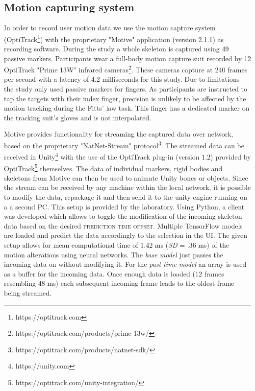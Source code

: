 \documentclass[sigconf]{acmart}
\begin{document}
\subsection{Motion capturing system}
In order to record user motion data we use the motion capture system (OptiTrack\footnote{https://optitrack.com}) with the proprietary "Motive" application (version 2.1.1) as recording software.
During the study a whole skeleton is captured using 49 passive markers. Participants wear a full-body motion capture suit recorded by 12 OptiTrack "Prime 13W" infrared cameras\footnote{https://optitrack.com/products/prime-13w/}. These cameras capture at 240 frames per second with a latency of 4.2 milliseconds for this study.
Due to limitations the study only used passive markers for fingers. As participants are instructed to tap the targets with their index finger, precision is unlikely to be affected by the motion tracking during the Fitts' law task. This finger has a dedicated marker on the tracking suit's gloves and is not interpolated.

Motive provides functionality for streaming the captured data over network, based on the proprietary "NatNet-Stream" protocol\footnote{https://optitrack.com/products/natnet-sdk/}. The streamed data can be received in Unity\footnote{https://unity.com} with the use of the OptiTrack plug-in (version 1.2) provided by OptiTrack\footnote{https://optitrack.com/unity-integration/} themselves. The data of individual markers, rigid bodies and skeletons from Motive can then be used to animate Unity bones or objects. Since the stream can be received by any machine within the local network, it is possible to modify the data, repackage it and then send it to the unity engine running on a a second PC. This setup is provided by the laboratory. Using Python, a client was developed which allows to toggle the modification of the incoming skeleton data based on the desired \textsc{prediction time offset}. Multiple TensorFlow models are loaded and predict the data accordingly to the selection in the UI. The given setup allows for mean computational time of 1.42 ms (\textit{SD} = .36 ms) of the motion alterations using neural networks. The \textit{base model} just passes the incoming data on without modifying it. For the \textit{past time model} an array is used as a buffer for the incoming data. Once enough data is loaded (12 frames resembling 48 ms) each subsequent incoming frame leads to the oldest frame being streamed.
\end{document}
